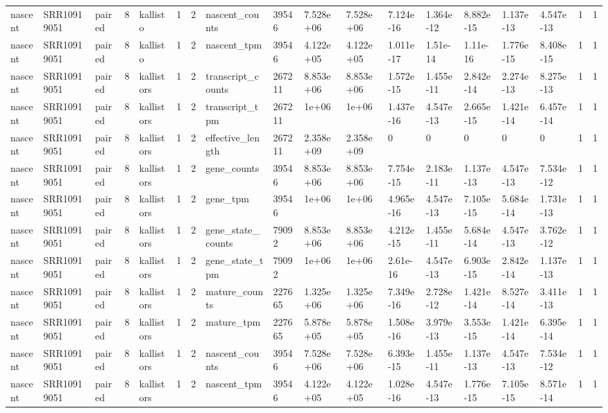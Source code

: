 \begin{tabular}{llllllllllllllllll}
nascent & SRR10919051 & paired & 8 & kallisto & 1 & 2 & nascent\_counts & 39546 & 7.528e+06 & 7.528e+06 & 7.124e-16 & 1.364e-12 & 8.882e-15 & 1.137e-13 & 4.547e-13 & 1 & 1 \\
nascent & SRR10919051 & paired & 8 & kallisto & 1 & 2 & nascent\_tpm & 39546 & 4.122e+05 & 4.122e+05 & 1.011e-17 & 1.51e-14 & 1.11e-16 & 1.776e-15 & 8.408e-15 & 1 & 1 \\
nascent & SRR10919051 & paired & 8 & kallistors & 1 & 2 & transcript\_counts & 267211 & 8.853e+06 & 8.853e+06 & 1.572e-15 & 1.455e-11 & 2.842e-14 & 2.274e-13 & 8.275e-13 & 1 & 1 \\
nascent & SRR10919051 & paired & 8 & kallistors & 1 & 2 & transcript\_tpm & 267211 & 1e+06 & 1e+06 & 1.437e-16 & 4.547e-13 & 2.665e-15 & 1.421e-14 & 6.457e-14 & 1 & 1 \\
nascent & SRR10919051 & paired & 8 & kallistors & 1 & 2 & effective\_length & 267211 & 2.358e+09 & 2.358e+09 & 0 & 0 & 0 & 0 & 0 & 1 & 1 \\
nascent & SRR10919051 & paired & 8 & kallistors & 1 & 2 & gene\_counts & 39546 & 8.853e+06 & 8.853e+06 & 7.754e-15 & 2.183e-11 & 1.137e-13 & 4.547e-13 & 7.534e-12 & 1 & 1 \\
nascent & SRR10919051 & paired & 8 & kallistors & 1 & 2 & gene\_tpm & 39546 & 1e+06 & 1e+06 & 4.965e-16 & 4.547e-13 & 7.105e-15 & 5.684e-14 & 1.731e-13 & 1 & 1 \\
nascent & SRR10919051 & paired & 8 & kallistors & 1 & 2 & gene\_state\_counts & 79092 & 8.853e+06 & 8.853e+06 & 4.212e-15 & 1.455e-11 & 5.684e-14 & 4.547e-13 & 3.762e-12 & 1 & 1 \\
nascent & SRR10919051 & paired & 8 & kallistors & 1 & 2 & gene\_state\_tpm & 79092 & 1e+06 & 1e+06 & 2.61e-16 & 4.547e-13 & 6.903e-15 & 2.842e-14 & 1.137e-13 & 1 & 1 \\
nascent & SRR10919051 & paired & 8 & kallistors & 1 & 2 & mature\_counts & 227665 & 1.325e+06 & 1.325e+06 & 7.349e-16 & 2.728e-12 & 1.421e-14 & 8.527e-14 & 3.411e-13 & 1 & 1 \\
nascent & SRR10919051 & paired & 8 & kallistors & 1 & 2 & mature\_tpm & 227665 & 5.878e+05 & 5.878e+05 & 1.508e-16 & 3.979e-13 & 3.553e-15 & 1.421e-14 & 6.395e-14 & 1 & 1 \\
nascent & SRR10919051 & paired & 8 & kallistors & 1 & 2 & nascent\_counts & 39546 & 7.528e+06 & 7.528e+06 & 6.393e-15 & 1.455e-11 & 1.137e-13 & 4.547e-13 & 7.534e-12 & 1 & 1 \\
nascent & SRR10919051 & paired & 8 & kallistors & 1 & 2 & nascent\_tpm & 39546 & 4.122e+05 & 4.122e+05 & 1.028e-16 & 4.547e-13 & 1.776e-15 & 7.105e-15 & 8.571e-14 & 1 & 1 \\

\end{tabular}
